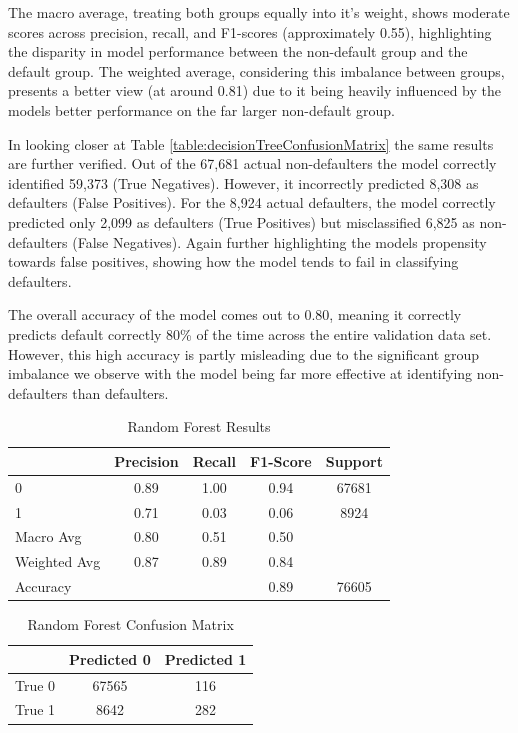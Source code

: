 \documentclass[12pt]{article}
\begin{document}
The macro average, treating both groups equally into it's weight, shows moderate scores across precision, recall, and F1-scores (approximately 0.55), highlighting the disparity in model performance between the non-default group and the default group. The weighted average, considering this imbalance between groups, presents a better view (at around 0.81) due to it being heavily influenced by the models better performance on the far larger non-default group.

In looking closer at Table \ref{table:decisionTreeConfusionMatrix} the same results are further verified. Out of the 67,681 actual non-defaulters the model correctly identified 59,373 (True Negatives). However, it incorrectly predicted 8,308 as defaulters (False Positives). For the 8,924 actual defaulters, the model correctly predicted only 2,099 as defaulters (True Positives) but misclassified 6,825 as non-defaulters (False Negatives). Again further highlighting the models propensity towards false positives, showing how the model tends to fail in classifying defaulters.

The overall accuracy of the model comes out to 0.80, meaning it correctly predicts default correctly 80\% of the time across the entire validation data set. However, this high accuracy is partly misleading due to the significant group imbalance we observe with the model being far more effective at identifying non-defaulters than defaulters.

\begin{table}[htbp]
    \centering
    \caption{Random Forest Results}
    \begin{tabular}{lcccc}
        \toprule
        & Precision & Recall & F1-Score & Support \\
        \midrule
        0 & 0.89 & 1.00 & 0.94 & 67681 \\
        1 & 0.71 & 0.03 & 0.06 & 8924 \\
        Macro Avg & 0.80 & 0.51 & 0.50 & \\
        Weighted Avg & 0.87 & 0.89 & 0.84 & \\
        \midrule
        Accuracy & & & 0.89 & 76605 \\
        \bottomrule
    \end{tabular}
    \label{table:randomForestResults}
\end{table}

\begin{table}[htbp]
    \centering
    \caption{Random Forest Confusion Matrix}
    \begin{tabular}{lcc}
        \toprule
        & Predicted 0 & Predicted 1 \\
        \midrule
        True 0 & 67565 & 116 \\
        True 1 & 8642 & 282 \\
        \bottomrule
    \end{tabular}
    \label{table:randomForestConfusionMatrix}
\end{table}
\end{document}
